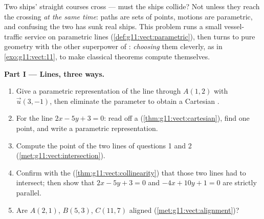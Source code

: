 \begin{problem}
\label{pb:g11:vect:1}
Two ships' straight courses cross --- must the ships collide? Not
unless they reach the crossing \emph{at the same time}: paths are
sets of points, motions are parametric, and confusing the two has
sunk real ships. This problem runs a small vessel-traffic service
on parametric lines (\cref{def:g11:vect:parametric}), then turns
to pure geometry with the other superpower of :
\emph{choosing} them cleverly, as in \cref{exo:g11:vect:11}, to
make classical theorems compute themselves.

\medskip
\noindent\textbf{Part I --- Lines, three ways.}
\begin{enumerate}
  \item Give a parametric representation of the line through
        $A(1, 2)$ with  $\vec u(3, -1)$, then
        eliminate the parameter to obtain a Cartesian .
  \item For the line $2x - 5y + 3 = 0$: read off a  (\cref{thm:g11:vect:cartesian}), find one point,
        and write a parametric representation.
  \item Compute the  point of the two lines of
        questions 1 and 2 (\cref{met:g11:vect:intersection}).
  \item Confirm with the 
        (\cref{thm:g11:vect:collinearity}) that those two lines
        had to intersect; then show that $2x - 5y + 3 = 0$ and
        $-4x + 10y + 1 = 0$ are strictly parallel.
  \item Are $A(2, 1)$, $B(5, 3)$, $C(11, 7)$ aligned
        (\cref{met:g11:vect:alignment})?
\end{enumerate}


\end{problem}
